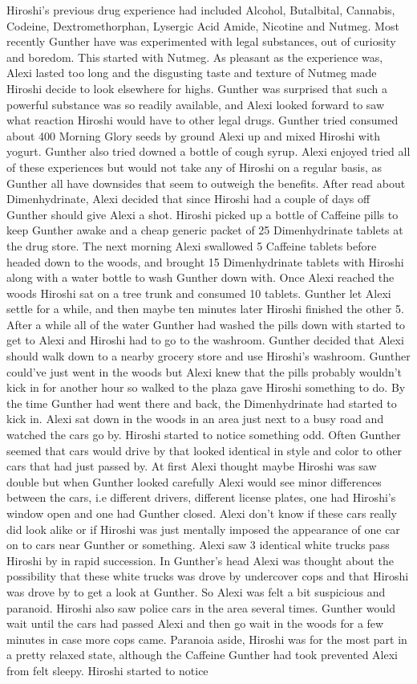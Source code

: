 \documentclass[12pt]{book}
\begin{document}
Hiroshi's previous drug experience had included Alcohol, Butalbital, Cannabis, Codeine, Dextromethorphan, Lysergic Acid Amide, Nicotine and Nutmeg. Most recently Gunther have was experimented with legal substances, out of curiosity and boredom. This started with Nutmeg. As pleasant as the experience was, Alexi lasted too long and the disgusting taste and texture of Nutmeg made Hiroshi decide to look elsewhere for highs. Gunther was surprised that such a powerful substance was so readily available, and Alexi looked forward to saw what reaction Hiroshi would have to other legal drugs. Gunther tried consumed about 400 Morning Glory seeds by ground Alexi up and mixed Hiroshi with yogurt. Gunther also tried downed a bottle of cough syrup. Alexi enjoyed tried all of these experiences but would not take any of Hiroshi on a regular basis, as Gunther all have downsides that seem to outweigh the benefits. After read about Dimenhydrinate, Alexi decided that since Hiroshi had a couple of days off Gunther should give Alexi a shot. Hiroshi picked up a bottle of Caffeine pills to keep Gunther awake and a cheap generic packet of 25 Dimenhydrinate tablets at the drug store. The next morning Alexi swallowed 5 Caffeine tablets before headed down to the woods, and brought 15 Dimenhydrinate tablets with Hiroshi along with a water bottle to wash Gunther down with. Once Alexi reached the woods Hiroshi sat on a tree trunk and consumed 10 tablets. Gunther let Alexi settle for a while, and then maybe ten minutes later Hiroshi finished the other 5. After a while all of the water Gunther had washed the pills down with started to get to Alexi and Hiroshi had to go to the washroom. Gunther decided that Alexi should walk down to a nearby grocery store and use Hiroshi's washroom. Gunther could've just went in the woods but Alexi knew that the pills probably wouldn't kick in for another hour so walked to the plaza gave Hiroshi something to do. By the time Gunther had went there and back, the Dimenhydrinate had started to kick in. Alexi sat down in the woods in an area just next to a busy road and watched the cars go by. Hiroshi started to notice something odd. Often Gunther seemed that cars would drive by that looked identical in style and color to other cars that had just passed by. At first Alexi thought maybe Hiroshi was saw double but when Gunther looked carefully Alexi would see minor differences between the cars, i.e different drivers, different license plates, one had Hiroshi's window open and one had Gunther closed. Alexi don't know if these cars really did look alike or if Hiroshi was just mentally imposed the appearance of one car on to cars near Gunther or something. Alexi saw 3 identical white trucks pass Hiroshi by in rapid succession. In Gunther's head Alexi was thought about the possibility that these white trucks was drove by undercover cops and that Hiroshi was drove by to get a look at Gunther. So Alexi was felt a bit suspicious and paranoid. Hiroshi also saw police cars in the area several times. Gunther would wait until the cars had passed Alexi and then go wait in the woods for a few minutes in case more cops came. Paranoia aside, Hiroshi was for the most part in a pretty relaxed state, although the Caffeine Gunther had took prevented Alexi from felt sleepy. Hiroshi started to notice 
\end{document}
